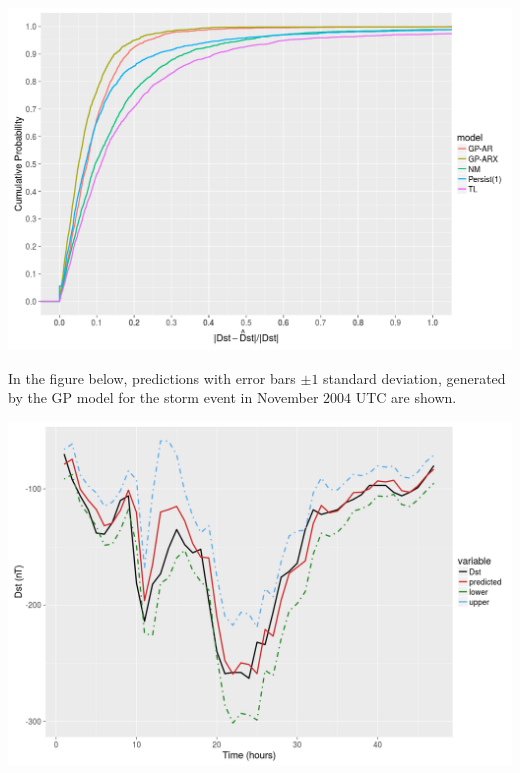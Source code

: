 \documentclass[landscape,a0b,final]{a0poster}
\newenvironment{poster}{
  \begin{center}
  \begin{minipage}[c]{0.85\textwidth}
}{
  \end{minipage} 
  \end{center}
}
\begin{document}
\begin{poster}
\begin{multicols}{3}
\includegraphics[width=\hsize]{Compare_RelProb} \label{fig:errorprob}


\vspace{\baselineskip}
In the figure below, predictions with error bars $\pm 1$ standard deviation, generated by the GP model for the storm event in November $2004$ UTC are shown.
\vspace{\baselineskip}

\includegraphics[width=\hsize]{Compare_pred_err_bar} \label{fig:plots}

\vspace{\baselineskip}


\end{multicols}

\end{poster}
\end{document}
